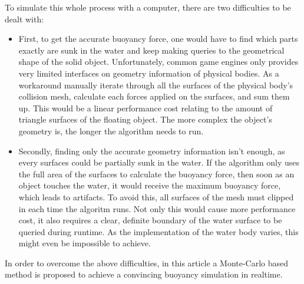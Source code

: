 To simulate this whole process with a computer, there are two difficulties to be dealt with:

\begin{itemize}
	\item
		First, to get the accurate buoyancy force, one would have to find which parts exactly are sunk in the water and keep making queries to the geometrical shape of the solid object.
		Unfortunately, common game engines only provides very limited interfaces on geometry information of physical bodies.
		As a workaround manually iterate through all the surfaces of the physical body's collision mesh, calculate each forces applied on the surfaces, and sum them up.
		This would be a linear performance cost relating to the amount of triangle surfaces of the floating object.
		The more complex the object's geometry is, the longer the algorithm needs to run.

	\item
		Secondly, finding only the accurate geometry information isn't enough, as every surfaces could be partially sunk in the water.
		If the algorithm only uses the full area of the surfaces to calculate the buoyancy force, then soon as an object touches the water, it would receive the maximum buoyancy force, which leads to artifacts.
		To avoid this, all surfaces of the mesh must clipped in each time the algoritm runs.
		Not only this would cause more performance cost, it also requires a clear, definite boundary of the water surface to be queried during runtime.
		As the implementation of the water body varies, this might even be impossible to achieve.
\end{itemize}

In order to overcome the above difficulties, in this article a Monte-Carlo based method is proposed to achieve a convincing buoyancy simulation in realtime.